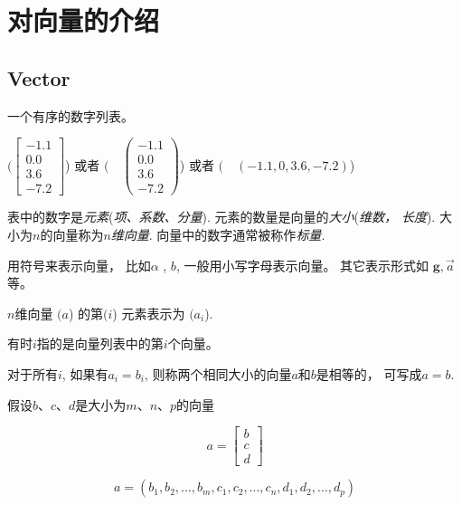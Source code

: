 \chapter{对向量的介绍}

\section{Vector}

\begin{definition}[Vector]
    一个有序的数字列表。

    $( \left[\begin{array}{c}-1.1 \\ 0.0 \\ 3.6 \\ -7.2\end{array}\right] $) 或者 $( \quad\left(\begin{array}{c}-1.1 \\ 0.0 \\ 3.6 \\ -7.2\end{array}\right) $) 或者 $( \quad(-1.1,0,3.6,-7.2) $)
\end{definition}

表中的数字是\textit{元素}(\textit{项、系数、分量}). 元素的数量是向量的\textit{大小}(\textit{维数， 长度}). 大小为$n$的向量称为\textit{$n$维向量}. 
向量中的数字通常被称作\textit{标量}. 

用符号来表示向量， 比如$\alpha$ , $b$, 一般用小写字母表示向量。 其它表示形式如 $\boldsymbol{g}, \vec{a}$ 等。

\begin{definition}[n维向量 $( a $) 的第 $( i $) 元素]
    $n$维向量 $( a $) 的第$( i $) 元素表示为 $( a_{i} $).

    有时$i$指的是向量列表中的第$i$个向量。
\end{definition}

\begin{definition}[$a=b$]
    对于所有$i$, 如果有$a_i = b_i$, 则称两个相同大小的向量$a$和$b$是相等的， 可写成$a = b$.
\end{definition}

\begin{definition}
    假设$b$、$c$、$d$是大小为$m$、$n$、$p$的向量
    
    \begin{equation} a=\left[\begin{array}{l}b \\ c \\ d\end{array}\right] \end{equation}

    \begin{equation} a=\left(b_{1}, b_{2}, \ldots, b_{m}, c_{1}, c_{2}, \ldots, c_{n}, d_{1}, d_{2}, \ldots, d_{p}\right) \end{equation}
\end{definition}

